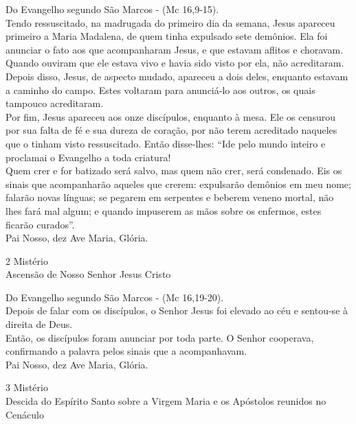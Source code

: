 \begin{flushleft}
    Do Evangelho segundo São Marcos - (\textcolor{VioletRed3}{Mc 16,9-15}). \\
    \hfill{} \break{}
    Tendo ressuscitado, na madrugada do primeiro dia da semana, Jesus apareceu primeiro a Maria Madalena, de quem tinha expulsado sete demônios. Ela foi anunciar o fato aos que acompanharam Jesus, e que estavam aflitos e choravam. Quando ouviram que ele estava vivo e havia sido visto por ela, não acreditaram. Depois disso, Jesus, de aspecto mudado, apareceu a dois deles, enquanto estavam a caminho do campo. Estes voltaram para anunciá-lo aos outros, os quais tampouco acreditaram.
    \vspace{.2cm} \\
    Por fim, Jesus apareceu aos onze discípulos, enquanto à mesa. Ele os censurou por sua falta de fé e sua dureza de coração, por não terem acreditado naqueles que o tinham visto ressuscitado. Então disse-lhes: ``Ide pelo mundo inteiro e proclamai o Evangelho a toda criatura!
    \vspace{.2cm} \\
    Quem crer e for batizado será salvo, mas quem não crer, será condenado. Eis os sinais que acompanharão aqueles que crerem: expulsarão demônios em meu nome; falarão novas línguas; se pegarem em serpentes e beberem veneno mortal, não lhes fará mal algum; e quando impuserem as mãos sobre os enfermos, estes ficarão curados''. \\
    \hfill{} \break{}
    Pai Nosso, dez Ave Maria, Glória.
\end{flushleft}
\begin{center}
    2\textordmasculine{} Mistério \\ Ascensão de Nosso Senhor Jesus Cristo
\end{center}
\begin{flushleft}
    Do Evangelho segundo São Marcos - (\textcolor{VioletRed3}{Mc 16,19-20}). \\
    \hfill{} \break{}
    Depois de falar com os discípulos, o Senhor Jesus foi elevado ao céu e sentou-se à direita de Deus.
    \vspace{.2cm} \\
    Então, os discípulos foram anunciar por toda parte. O Senhor cooperava, confirmando a palavra pelos sinais que a acompanhavam. \\
    \hfill{} \break{}
    Pai Nosso, dez Ave Maria, Glória.
\end{flushleft}
\newpage
\begin{center}
    3\textordmasculine{} Mistério \\ Descida do Espírito Santo sobre a Virgem Maria e os Apóstolos reunidos no Cenáculo
\end{center}
